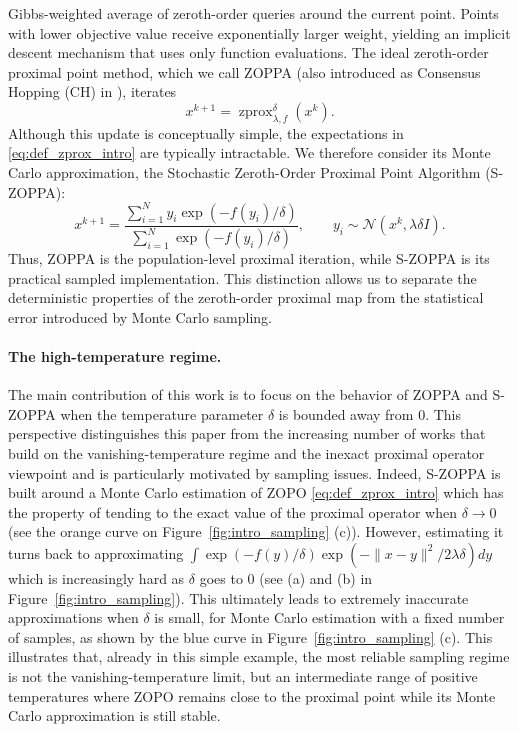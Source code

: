 \documentclass{article}
\newcommand{\zprox}{\ensuremath{\operatorname{zprox}}}
\begin{document}
Gibbs-weighted average of zeroth-order queries around the current point. Points with lower objective
value receive exponentially larger weight, yielding an implicit descent mechanism that uses only
function evaluations. The ideal zeroth-order proximal point method, which we call ZOPPA \cite{osher2023hamilton} (also introduced as Consensus Hopping (CH) in \cite{Fornasier2024}), iterates
\begin{equation}\label{eq:ZOPPA_intro}
    x^{k+1}
    =
    \zprox^\delta_{\lambda,f}(x^k).
\end{equation}
Although this update is conceptually simple, the expectations in \eqref{eq:def_zprox_intro} are
typically intractable. We therefore consider its Monte Carlo approximation, the Stochastic
Zeroth-Order Proximal Point Algorithm (S-ZOPPA):
\begin{equation}\label{eq:S-ZOPPA_intro}
    x^{k+1}
    =
    \frac{
    \sum_{i=1}^N y_i \exp(-f(y_i)/\delta)
    }{
    \sum_{i=1}^N \exp(-f(y_i)/\delta)
    },
    \qquad
    y_i\sim\mathcal{N}(x^k,\lambda\delta I).
\end{equation}
Thus, ZOPPA is the population-level proximal iteration, while S-ZOPPA is its practical sampled implementation. This distinction allows us to separate the deterministic properties of the zeroth-order proximal map from the statistical error introduced by Monte Carlo sampling.

\paragraph{The high-temperature regime.} The main contribution of this work is to focus on the behavior of ZOPPA and S-ZOPPA when the temperature parameter \(\delta\) is bounded away from \(0\). This perspective distinguishes this paper from the increasing number of works \cite{osher2023hamilton, zhang2024inexact, di2026operator, Fornasier2026} that build on the vanishing-temperature regime and the inexact proximal operator viewpoint and is particularly motivated by sampling issues. Indeed, S-ZOPPA is built around a Monte Carlo estimation of ZOPO \eqref{eq:def_zprox_intro} which has the property of tending to the exact value of the proximal operator when \(\delta\to0\) (see the orange curve on Figure~\ref{fig:intro_sampling} (c)). However, estimating it turns back to approximating  \(\int \exp(-f(y)/\delta)\exp(-\|x-y\|^2/2\lambda\delta) dy\) which is increasingly hard as \(\delta\) goes to \(0\) (see (a) and (b) in Figure~\ref{fig:intro_sampling}). This ultimately leads to extremely inaccurate approximations when \(\delta\) is small, for Monte Carlo estimation with a fixed number of samples, as shown by the blue curve in Figure~\ref{fig:intro_sampling} (c). This illustrates that, already in this simple example, the most reliable sampling regime is not the vanishing-temperature limit, but an intermediate range of positive temperatures where ZOPO remains close to the proximal point while its Monte Carlo approximation is still stable.
\end{document}
